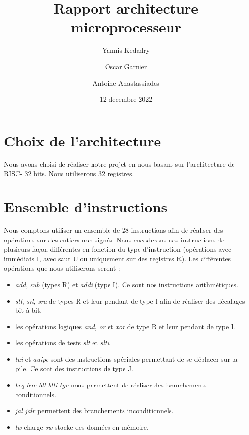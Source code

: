 \documentclass{article}
\title{Rapport architecture microprocesseur}
\author{Yannis Kedadry \and Oscar Garnier \and Antoine Anastassiades }
\date{12 decembre 2022}
\newcommand{\RNum}[1]{\uppercase\expandafter{\romannumeral #1\relax}}
\newcommand{\risc}{RISC-\RNum{5}}
\begin{document}
\maketitle

\section{Choix de l'architecture}
Nous avons choisi de réaliser notre projet en nous basant sur l'architecture de \risc{} 32 bits. Nous utiliserons 32 registres.

\section{Ensemble d'instructions}
Nous comptons utiliser un ensemble de 28 instructions afin de réaliser des opérations sur des entiers non signés. 
Nous encoderons nos instructions de plusieurs façon différentes en fonction du type d'instruction 
(opérations avec immédiats I, avec saut U ou uniquement sur des registres R). 
Les différentes opérations que nous utiliserons seront : 
\begin{itemize}
	\item \emph{add}, \emph{sub} (types R) et \emph{addi} (type I). Ce sont nos instructions arithmétiques.
	\item \emph{sll}, \emph{srl}, \emph{sra} de types R et leur pendant de type I afin de réaliser des décalages bit à bit.
	\item les opérations logiques \emph{and}, \emph{or} et \emph{xor} de type R et leur pendant de type I.
	\item les opérations de tests \emph{slt} et \emph{slti}.
	\item \emph{lui} et \emph{auipc} sont des instructions spéciales permettant de se déplacer sur la pile. Ce sont des instructions de type J.
	\item \emph{beq} \emph{bne} \emph{blt} \emph{blti} \emph{bge} nous permettent de réaliser des branchements conditionnels.
	\item \emph{jal} \emph{jalr} permettent des branchements inconditionnels.
	\item \emph{lw} charge \emph{sw} stocke des données en mémoire.
\end{itemize}
\end{document}
